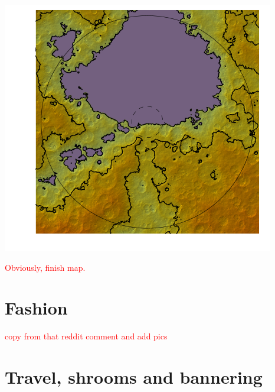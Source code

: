 \documentclass[10pt,oneside]{memoir}
\newcommand{\cmmnt}[1]{\textcolor{red}{#1}}
\begin{document}
\includegraphics{../maps/map/map.png}

\cmmnt{Obviously, finish map.}

\pagebreak

\section{Fashion}

\cmmnt{copy from that reddit comment and add pics}

\pagebreak

\section{Travel, shrooms and bannering}
\end{document}
